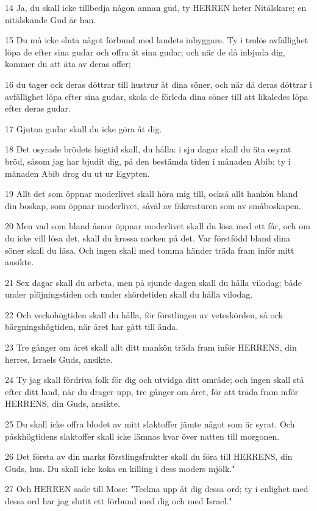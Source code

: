 \par 14 Ja, du skall icke tillbedja någon annan gud, ty HERREN heter Nitälskare; en nitälskande Gud är han.
\par 15 Du må icke sluta något förbund med landets inbyggare. Ty i trolös avfällighet löpa de efter sina gudar och offra åt sina gudar; och när de då inbjuda dig, kommer du att äta av deras offer;
\par 16 du tager ock deras döttrar till hustrur åt dina söner, och när då deras döttrar i avfällighet löpa efter sina gudar, skola de förleda dina söner till att likaledes löpa efter deras gudar.
\par 17 Gjutna gudar skall du icke göra åt dig.
\par 18 Det osyrade brödets högtid skall, du hålla: i sju dagar skall du äta osyrat bröd, såsom jag har bjudit dig, på den bestämda tiden i månaden Abib; ty i månaden Abib drog du ut ur Egypten.
\par 19 Allt det som öppnar moderlivet skall höra mig till, också allt hankön bland din boskap, som öppnar moderlivet, såväl av fäkreaturen som av småboskapen.
\par 20 Men vad som bland åsnor öppnar moderlivet skall du lösa med ett får, och om du icke vill lösa det, skall du krossa nacken på det. Var förstfödd bland dina söner skall du läsa. Och ingen skall med tomma händer träda fram inför mitt ansikte.
\par 21 Sex dagar skall du arbeta, men på sjunde dagen skall du hålla vilodag; både under plöjningstiden och under skördetiden skall du hålla vilodag.
\par 22 Och veckohögtiden skall du hålla, för förstlingen av veteskörden, så ock bärgningshögtiden, när året har gått till ända.
\par 23 Tre gånger om året skall allt ditt mankön träda fram inför HERRENS, din herres, Israels Guds, ansikte.
\par 24 Ty jag skall fördriva folk för dig och utvidga ditt område; och ingen skall stå efter ditt land, när du drager upp, tre gånger om året, för att träda fram inför HERRENS, din Guds, ansikte.
\par 25 Du skall icke offra blodet av mitt slaktoffer jämte något som är syrat. Och påskhögtidens slaktoffer skall icke lämnas kvar över natten till morgonen.
\par 26 Det första av din marks förstlingsfrukter skall du föra till HERRENS, din Guds, hus. Du skall icke koka en killing i dess moders mjölk."
\par 27 Och HERREN sade till Mose: "Teckna upp åt dig dessa ord; ty i enlighet med dessa ord har jag slutit ett förbund med dig och med Israel."
